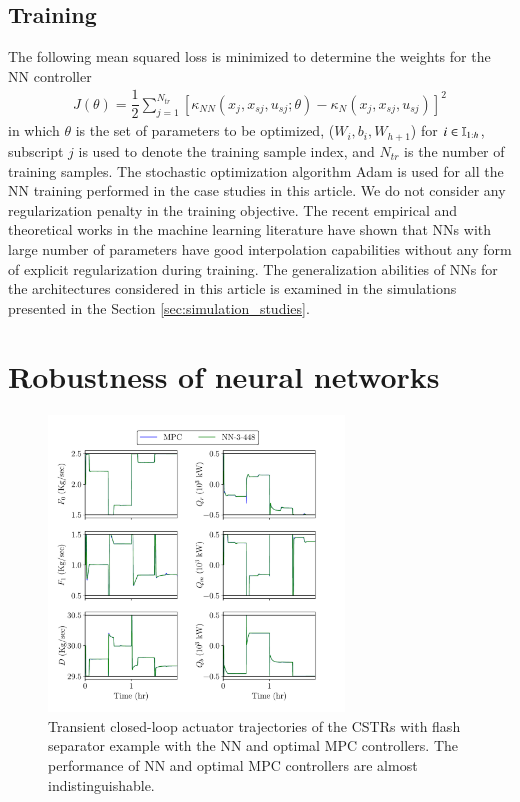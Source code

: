 \documentclass[preprint,5p, twocolumn, authoryear]{elsarticle}
\begin{document}
\subsection{Training}
The following mean squared loss is minimized to determine the weights for the NN
controller
\begin{align}
    J (\theta) = \dfrac{1}{2}\sum_{j=1}^{N_{tr}} 
[\kappa_{NN}(x_j, x_{sj}, u_{sj}; \theta) - \kappa_N(x_j, x_{sj}, u_{sj})]^2 
\end{align}
in which $\theta$ is the set of parameters to be optimized, ($W_i, b_i,
W_{h+1}$) for $i \in \mathbb{I}_{1:h}$, subscript $j$ is used to denote the training
sample index, and $N_{tr}$ is the number of training samples. The stochastic
optimization algorithm Adam \citep*{kingma:ba:2014} is used for all the NN
training performed in the case studies in this article. We do not consider any
regularization penalty in the training objective. The recent empirical and
theoretical works in the machine learning literature have shown that NNs with
large number of parameters have good interpolation capabilities
\citep*{belkin:hsu:ma:mandal:2019, zhang:bengio:hardt:recht:vinyals:2017,
arora:simon:hu:li:wang:2019, allen-zhu:li:liang:2019} without any form of
explicit regularization during training. The generalization abilities of NNs for
the architectures considered in this article is examined in the simulations
presented in the Section \ref{sec:simulation_studies}.

\section{Robustness of neural networks} \label{sec:robustness}

\begin{figure}[!h]
    \centering
	\includegraphics[page=1, width=0.7\textwidth,
		height=0.5\textheight]{cstrs_comparision_plots.pdf}    
        \caption{Transient closed-loop actuator trajectories of the CSTRs with
        flash separator example with the NN and optimal MPC controllers. The
        performance of NN and optimal MPC controllers are almost
        indistinguishable.}   
    \label{fig:cl_cstrs_inputs}
\end{figure}
\end{document}
